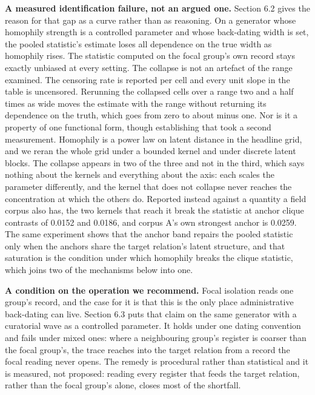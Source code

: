 \documentclass[twoside,11pt]{article}
\begin{document}
\textbf{A measured identification failure, not an argued one.} Section 6.2 gives the reason for that gap as a curve rather than as reasoning. On a generator whose homophily strength is a controlled parameter and whose back-dating width is set, the pooled statistic's estimate loses all dependence on the true width as homophily rises. The statistic computed on the focal group's own record stays exactly unbiased at every setting. The collapse is not an artefact of the range examined. The censoring rate is reported per cell and every unit slope in the table is uncensored. Rerunning the collapsed cells over a range two and a half times as wide moves the estimate with the range without returning its dependence on the truth, which goes from zero to about minus one. Nor is it a property of one functional form, though establishing that took a second measurement. Homophily is a power law on latent distance in the headline grid, and we reran the whole grid under a bounded kernel and under discrete latent blocks. The collapse appears in two of the three and not in the third, which says nothing about the kernels and everything about the axis: each scales the parameter differently, and the kernel that does not collapse never reaches the concentration at which the others do. Reported instead against a quantity a field corpus also has, the two kernels that reach it break the statistic at anchor clique contrasts of 0.0152 and 0.0186, and corpus A's own strongest anchor is 0.0259. The same experiment shows that the anchor band repairs the pooled statistic only when the anchors share the target relation's latent structure, and that saturation is the condition under which homophily breaks the clique statistic, which joins two of the mechanisms below into one.

\textbf{A condition on the operation we recommend.} Focal isolation reads one group's record, and the case for it is that this is the only place administrative back-dating can live. Section 6.3 puts that claim on the same generator with a curatorial wave as a controlled parameter. It holds under one dating convention and fails under mixed ones: where a neighbouring group's register is coarser than the focal group's, the trace reaches into the target relation from a record the focal reading never opens. The remedy is procedural rather than statistical and it is measured, not proposed: reading every register that feeds the target relation, rather than the focal group's alone, closes most of the shortfall.
\end{document}
